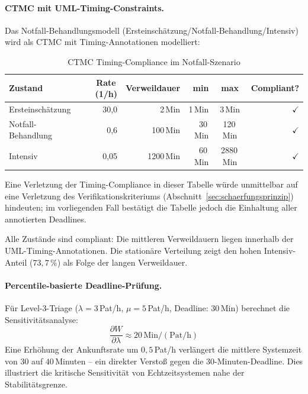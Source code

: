 ﻿\documentclass[a4paper,12pt]{report}
\theoremstyle{definition}
\begin{document}
\paragraph{CTMC mit UML-Timing-Constraints.}
Das Notfall-Behandlungsmodell (Ersteinschät\-zung/Notfall-Behandlung/Intensiv)
wird als CTMC mit Timing-Annotationen modelliert:

\begin{table}[H]
	\centering
	\begin{tabular}{@{}lrrrcr@{}}
		\toprule
		\textbf{Zustand} & \textbf{Rate}\,(1/h) & \textbf{Verweildauer} &
		\textbf{min} & \textbf{max} & \textbf{Compliant?} \\
		\midrule
		Ersteinschätzung  &  30{,}0 &  2\,Min &  1\,Min &   3\,Min & $\checkmark$ \\
		Notfall-Behandlung &  0{,}6 & 100\,Min & 30\,Min & 120\,Min & $\checkmark$ \\
		Intensiv           & 0{,}05 & 1200\,Min & 60\,Min & 2880\,Min& $\checkmark$ \\
		\bottomrule
	\end{tabular}
	\caption{CTMC Timing-Compliance im Notfall-Szenario}
\label{tab:ctmc-notfall}
	\label{tab:ctmc-compliance}
\end{table}

Eine Verletzung der Timing-Compliance in dieser Tabelle würde unmittelbar auf eine Verletzung des Verifikationskriteriums (Abschnitt~\ref{sec:schaerfungsprinzip}) hindeuten; im vorliegenden Fall bestätigt die Tabelle jedoch die Einhaltung aller annotierten Deadlines.

Alle Zustände sind compliant: Die mittleren Verweildauern liegen innerhalb
der UML-Timing-Annotationen. Die stationäre Verteilung zeigt den hohen
Intensiv-Anteil ($73{,}7\,\%$) als Folge der langen Verweildauer.

\paragraph{Percentile-basierte Deadline-Prüfung.}
Für Level-3-Triage ($\lambda = 3$\,Pat/h, $\mu = 5$\,Pat/h,
Deadline: 30\,Min) berechnet die Sensitivitätsanalyse:
\begin{equation}
	\frac{\partial W}{\partial \lambda} \approx 20\,\text{Min}/(\text{Pat/h})
\end{equation}
Eine Erhöhung der Ankunftsrate um $0{,}5$\,Pat/h verlängert die
mittlere Systemzeit von $30$ auf $40$\,Minuten -- ein direkter Verstoß
gegen die 30-Minuten-Deadline. Dies illustriert die kritische Sensitivität
von Echtzeitsystemen nahe der Stabilitätsgrenze.
\end{document}
